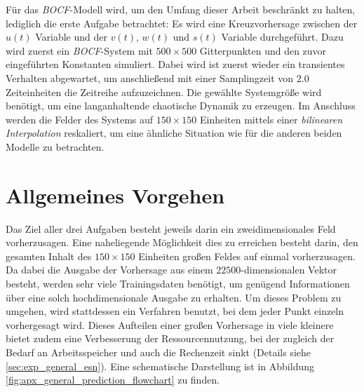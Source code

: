 Für das \textit{BOCF}-Modell wird, um den Umfang dieser Arbeit beschränkt zu halten, lediglich die erste Aufgabe betrachtet: Es wird eine Kreuzvorhersage zwischen der $u(t)$ Variable und der $v(t)$, $w(t)$ und $s(t)$ Variable durchgeführt. Dazu wird zuerst ein \textit{BOCF}-System mit $500 \times 500$ Gitterpunkten und den zuvor eingeführten Konstanten simuliert. Dabei wird ist zuerst wieder ein transientes Verhalten abgewartet, um anschließend mit einer Samplingzeit von $2.0$ Zeiteinheiten die Zeitreihe aufzuzeichnen. Die gewählte Systemgröße wird benötigt, um eine langanhaltende chaotische Dynamik zu erzeugen. Im Anschluss werden die Felder des Systems auf $150 \times 150$ Einheiten mittels einer \textit{bilinearen Interpolation} reskaliert, um eine ähnliche Situation wie für die anderen beiden Modelle zu betrachten. 

\section{Allgemeines Vorgehen}
\label{sc:experiments_general}
Das Ziel aller drei Aufgaben besteht jeweils darin ein zweidimensionales Feld vorherzusagen. Eine naheliegende Möglichkeit dies zu erreichen besteht darin, den gesamten Inhalt des $150 \times 150$ Einheiten großen Feldes auf einmal vorherzusagen. Da dabei die Ausgabe der Vorhersage aus einem $22500$-dimensionalen Vektor besteht, werden sehr viele Trainingsdaten benötigt, um genügend Informationen über eine solch hochdimensionale Ausgabe zu erhalten. Um dieses Problem zu umgehen, wird stattdessen ein Verfahren benutzt, bei dem jeder Punkt einzeln vorhergesagt wird. Dieses Aufteilen einer großen Vorhersage in viele kleinere bietet zudem eine Verbesserung der Ressourcennutzung, bei der zugleich der Bedarf an Arbeitsspeicher und auch die Rechenzeit sinkt (Details siehe \ref{sec:exp_general_esn}). Eine schematische Darstellung ist in Abbildung \ref{fig:apx_general_prediction_flowchart} zu finden.\\

